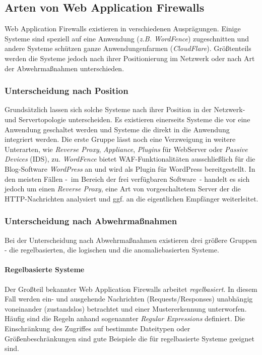 \subsection{Arten von Web Application Firewalls}

Web Application Firewalls existieren in verschiedenen Ausprägungen. Einige Systeme sind speziell auf eine Anwendung (\emph{z.B. WordFence}) zugeschnitten und andere Systeme schützen ganze Anwendungenfarmen (\emph{CloudFlare}). Größtenteils werden die Systeme jedoch nach ihrer Positionierung im Netzwerk oder nach Art der Abwehrmaßnahmen unterschieden.

\subsubsection{Unterscheidung nach Position}
Grundsätzlich lassen sich solche Systeme nach ihrer Position in der Netzwerk- und Servertopologie unterscheiden. Es existieren einerseits Systeme die vor eine Anwendung geschaltet werden und Systeme die direkt in die Anwendung integriert werden. Die erste Gruppe lässt noch eine Verzweigung in weitere Unterarten, wie \emph{Reverse Proxy}, \emph{Appliance}, \emph{Plugins} für WebServer oder \emph{Passive Devices} (IDS), zu. \emph{WordFence} bietet WAF-Funktionalitäten ausschließlich für die Blog-Software \emph{WordPress} an und wird als Plugin für WordPress bereitgestellt. In den meisten Fällen -~im Bereich der frei verfügbaren Software~- handelt es sich jedoch um einen \emph{Reverse Proxy}, eine Art von vorgeschaltetem Server der die HTTP-Nachrichten analysiert und ggf. an die eigentlichen Empfänger weiterleitet.


\subsubsection{Unterscheidung nach Abwehrmaßnahmen}

Bei der Unterscheidung nach Abwehrmaßnahmen existieren drei größere Gruppen - die regelbasierten, die logischen und die anomaliebasierten Systeme. 

\paragraph{Regelbasierte Systeme}
Der Großteil bekannter Web Application Firewalls arbeitet \emph{regelbasiert}. In diesem Fall werden ein- und ausgehende Nachrichten (Requests/Responses) unabhängig voneinander (zustandslos) betrachtet und einer Mustererkennung unterworfen. Häufig sind die Regeln anhand sogenannter \emph{Regular Expressions} definiert. Die Einschränkung des Zugriffes auf bestimmte Dateitypen oder Größenbeschränkungen sind gute Beispiele die für regelbasierte Systeme geeignet sind. 

